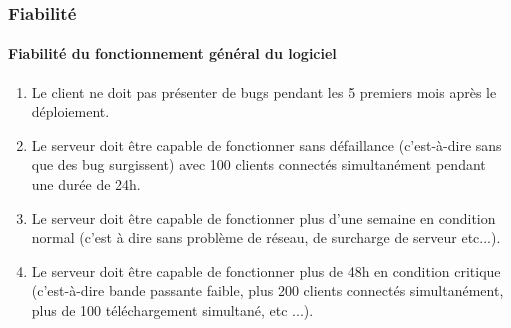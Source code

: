 \documentclass[10pt,a4paper]{report}
\begin{document}
\subsubsection{Fiabilité}
\paragraph{Fiabilité du fonctionnement général du logiciel}

	\begin{enumerate}
		\item Le client ne doit pas présenter de bugs pendant les 5 premiers mois après le déploiement.
	
		\item Le serveur doit être capable de fonctionner sans défaillance (c'est-à-dire sans que des bug  surgissent) avec 100 clients connectés simultanément pendant une durée de 24h.
		
		\item Le serveur doit être capable de fonctionner plus d'une semaine en condition normal (c'est à dire sans problème de réseau, de surcharge de serveur etc...).	
		
		\item Le serveur doit être capable de fonctionner plus de 48h en condition critique (c'est-à-dire bande passante faible, plus 200 clients connectés simultanément, plus de 100 téléchargement simultané, etc ...).
	\end{enumerate}
	
	
\end{document}
